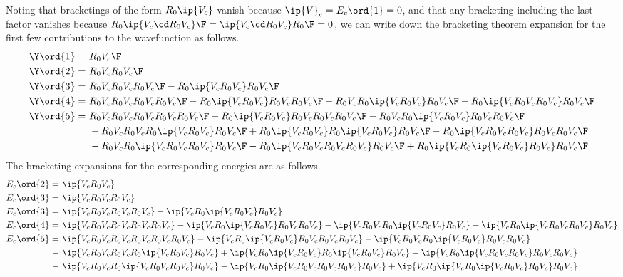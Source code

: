 \documentclass[11pt,fleqn]{article}
\numberwithin{equation}{section}
\begin{document}
\begin{ex}
Noting that bracketings of the form $R_0\ip{V_c}$ vanish because $\ip{V}_c=E_c\ord{1}=0$, and that any bracketing including the last factor vanishes because $R_0\ip{V_c\cd R_0V_c}\F=\ip{V_c\cd R_0V_c}R_0\F=0$, we can write down the bracketing theorem expansion for the first few contributions to the wavefunction as follows.
\begin{align*}
  \Y\ord{1}
=&\
  R_0V_c\F
\\
  \Y\ord{2}
=&\
  R_0V_cR_0V_c\F
\\
  \Y\ord{3}
=&\
  R_0V_cR_0V_cR_0V_c\F
-
  R_0\ip{V_cR_0V_c}R_0V_c\F
\\
  \Y\ord{4}
=&\
  R_0V_cR_0V_cR_0V_cR_0V_c\F
-
  R_0\ip{V_cR_0V_c}R_0V_cR_0V_c\F
-
  R_0V_cR_0\ip{V_cR_0V_c}R_0V_c\F
-
  R_0\ip{V_cR_0V_cR_0V_c}R_0V_c\F
\\
  \Y\ord{5}
=&\
  R_0V_cR_0V_cR_0V_cR_0V_cR_0V_c\F
-
  R_0\ip{V_cR_0V_c}R_0V_cR_0V_cR_0V_c\F
-
  R_0V_cR_0\ip{V_cR_0V_c}R_0V_cR_0V_c\F
\\&\
-
  R_0V_cR_0V_cR_0\ip{V_cR_0V_c}R_0V_c\F
+
  R_0\ip{V_cR_0V_c}R_0\ip{V_cR_0V_c}R_0V_c\F
-
  R_0\ip{V_cR_0V_cR_0V_c}R_0V_cR_0V_c\F
\\&\
-
  R_0V_cR_0\ip{V_cR_0V_cR_0V_c}R_0V_c\F
-
  R_0\ip{V_cR_0V_cR_0V_cR_0V_c}R_0V_c\F
+
  R_0\ip{V_cR_0\ip{V_cR_0V_c}R_0V_c}R_0V_c\F
\end{align*}
The bracketing expansions for the corresponding energies are as follows.
\begin{align*}
  E_c\ord{2}
=&\
  \ip{V_cR_0V_c}
\\
  E_c\ord{3}
=&\
  \ip{V_cR_0V_cR_0V_c}
\\
  E_c\ord{3}
=&\
  \ip{V_cR_0V_cR_0V_cR_0V_c}
-
  \ip{V_cR_0\ip{V_cR_0V_c}R_0V_c}
\\
  E_c\ord{4}
=&\
  \ip{V_cR_0V_cR_0V_cR_0V_cR_0V_c}
-
  \ip{V_cR_0\ip{V_cR_0V_c}R_0V_cR_0V_c}
-
  \ip{V_cR_0V_cR_0\ip{V_cR_0V_c}R_0V_c}
-
  \ip{V_cR_0\ip{V_cR_0V_cR_0V_c}R_0V_c}
\\
  E_c\ord{5}
=&\
  \ip{V_cR_0V_cR_0V_cR_0V_cR_0V_cR_0V_c}
-
  \ip{V_cR_0\ip{V_cR_0V_c}R_0V_cR_0V_cR_0V_c}
-
  \ip{V_cR_0V_cR_0\ip{V_cR_0V_c}R_0V_cR_0V_c}
\\-&\
  \ip{V_cR_0V_cR_0V_cR_0\ip{V_cR_0V_c}R_0V_c}
+
  \ip{V_cR_0\ip{V_cR_0V_c}R_0\ip{V_cR_0V_c}R_0V_c}
-
  \ip{V_cR_0\ip{V_cR_0V_cR_0V_c}R_0V_cR_0V_c}
\\-&\
  \ip{V_cR_0V_cR_0\ip{V_cR_0V_cR_0V_c}R_0V_c}
-
  \ip{V_cR_0\ip{V_cR_0V_cR_0V_cR_0V_c}R_0V_c}
+
  \ip{V_cR_0\ip{V_cR_0\ip{V_cR_0V_c}R_0V_c}R_0V_c}
\end{align*}
\end{ex}
\end{document}
